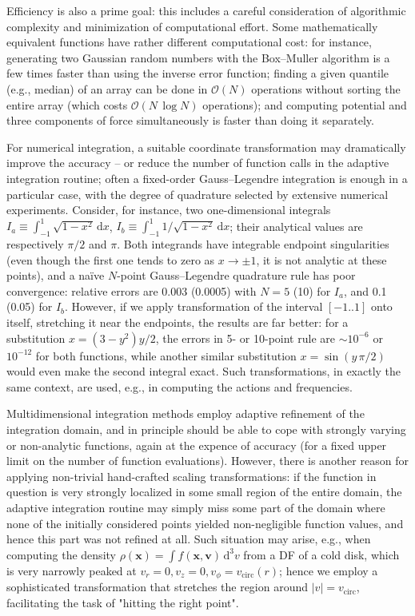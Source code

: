 \documentclass[12pt]{article}
\newcommand{\D}{\mathrm{d}}
\newcommand{\bv}{\boldsymbol{v}}
\newcommand{\bx}{\boldsymbol{x}}
\begin{document}
Efficiency is also a prime goal: this includes a careful consideration of algorithmic complexity and minimization of computational effort. Some mathematically equivalent functions have rather different computational cost: for instance, generating two Gaussian random numbers with the Box--Muller algorithm is a few times faster than using the inverse error function; finding a given quantile (e.g., median) of an array can be done in $\mathcal{O}(N)$ operations without sorting the entire array (which costs $\mathcal{O}(N\,\log N)$ operations); and computing potential and three components of force simultaneously is faster than doing it separately.

For numerical integration, a suitable coordinate transformation may dramatically improve the accuracy -- or reduce the number of function calls in the adaptive integration routine; often a fixed-order Gauss--Legendre integration is enough in a particular case, with the degree of quadrature selected by extensive numerical experiments.
Consider, for instance, two one-dimensional integrals $I_a \equiv \int_{-1}^1 \sqrt{1-x^2}\,\D x$,
$I_b \equiv \int_{-1}^1 1/\sqrt{1-x^2}\,\D x$; their analytical values are respectively $\pi/2$ and $\pi$. Both integrands have integrable endpoint singularities (even though the first one tends to zero as $x\to \pm 1$, it is not analytic at these points), and a na\"ive $N$-point Gauss--Legendre quadrature rule has poor convergence: relative errors are 0.003 (0.0005) with $N=5$ (10) for $I_a$, and 0.1 (0.05) for $I_b$. However, if we apply transformation of the interval $[-1..1]$ onto itself, stretching it near the endpoints, the results are far better: for a substitution $x = (3-y^2)y/2$, the errors in 5- or 10-point rule are $\sim10^{-6}$ or $10^{-12}$ for both functions, while another similar substitution $x = \sin(y\,\pi/2)$ would even make the second integral exact. Such transformations, in exactly the same context, are used, e.g., in computing the actions and frequencies.

Multidimensional integration methods employ adaptive refinement of the integration domain, and in principle should be able to cope with strongly varying or non-analytic functions, again at the expence of accuracy (for a fixed upper limit on the number of function evaluations). However, there is another reason for applying non-trivial hand-crafted scaling transformations: if the function in question is very strongly localized in some small region of the entire domain, the adaptive integration routine may simply miss some part of the domain where none of the initially considered points yielded non-negligible function values, and hence this part was not refined at all. Such situation may arise, e.g., when computing the density $\rho(\bx) = \int f(\bx,\bv)\,\D^3v$ from a DF of a cold disk, which is very narrowly peaked at $v_r=0, v_z=0, v_\phi=v_\mathrm{circ}(r)$; hence we employ a sophisticated transformation that stretches the region around $|v| = v_\mathrm{circ}$, facilitating the task of "hitting the right point".
\end{document}
